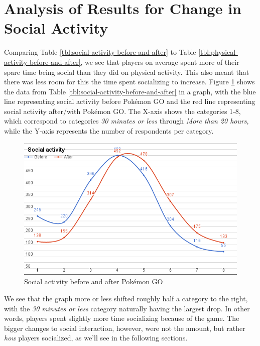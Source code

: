\section{Analysis of Results for Change in Social Activity}

Comparing Table \ref{tbl:social-activity-before-and-after} to Table \ref{tbl:physical-activity-before-and-after}, we see that players on average spent more of their spare time being social than they did on physical activity. This also meant that there was less room for this the time spent socializing to increase. Figure \ref{fig:social-activity-graph} shows the data from Table \ref{tbl:social-activity-before-and-after} in a graph, with the blue line representing social activity before Pokémon GO and the red line representing social activity after/with Pokémon GO. The X-axis shows the categories 1-8, which correspond to categories \emph{30 minutes or less} through \emph{More than 20 hours}, while the Y-axis represents the number of respondents per category.

\begin{figure}[h]
	\centering
	\includegraphics[width=\textwidth]{Figures/social-activity-graph-2}
	\caption{Social activity before and after Pokémon GO}
	\label{fig:social-activity-graph}
\end{figure}

We see that the graph more or less shifted roughly half a category to the right, with the \emph{30 minutes or less} category naturally having the largest drop. In other words, players spent slightly more time socializing because of the game. The bigger changes to social interaction, however, were not the amount, but rather \emph{how} players socialized, as we'll see in the following sections.


